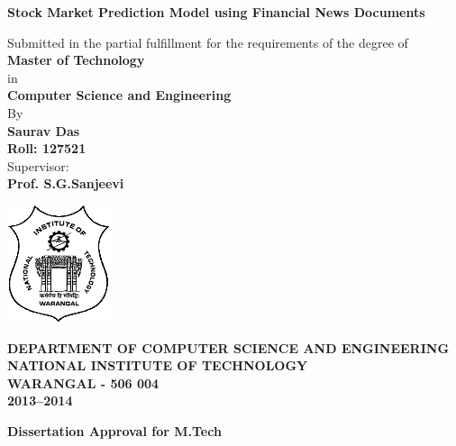 \documentclass[a4paper,12bp]{report}
\begin{document}
\begin{titlepage}
 
 \begin{center}
  \huge\textbf{Stock Market Prediction Model using Financial News Documents}
  
  \vspace{5mm}
  \large Submitted in the partial fulfillment for the requirements of the 
degree of\\
\Large\textbf{Master of Technology}\\
\large in\\
\Large\textbf{Computer Science and Engineering}\\
\vspace{15mm}
\Large By\\
\vspace{3mm}
\Large\textbf{Saurav Das\\
Roll: 127521}\\
\vspace{15mm}
\Large Supervisor:\\
\vspace{3mm}
\Large\textbf{Prof. S.G.Sanjeevi}

\vspace{10mm}
\includegraphics[scale=1]{pictures/nitw-logo.png}

\vspace{5mm}
\large \textbf{DEPARTMENT OF COMPUTER SCIENCE AND ENGINEERING\\
NATIONAL INSTITUTE OF TECHNOLOGY\\ WARANGAL - 506 004\\
2013--2014}
 \end{center}

\end{titlepage}


\newpage
\thispagestyle{empty}
\begin{center}
\LARGE{\textbf{Dissertation Approval for M.Tech}}
\end{center}
\end{document}

